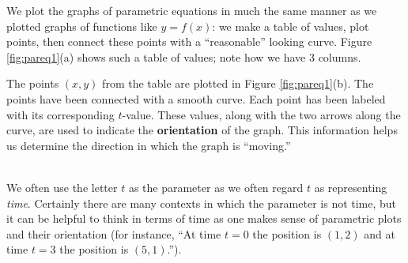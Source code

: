 {We plot the graphs of parametric equations in much the same manner as we plotted graphs of functions like $y=f(x)$: we make a table of values, plot points, then connect these points with a ``reasonable'' looking curve. Figure \ref{fig:pareq1}(a) shows such a table of values; note how we have 3 columns.

The points $(x,y)$ from the table are plotted in Figure \ref{fig:pareq1}(b). The points have been connected with a smooth curve. Each point has been labeled with its corresponding $t$-value. These values, along with the two arrows along the curve, are used to indicate the \textbf{orientation} of the graph. This information helps us determine the direction in which the graph is ``moving.''
}\\

We often use the letter $t$ as the parameter as we often regard $t$ as representing \textit{time}. Certainly there are many contexts in which the parameter is not time, but it can be helpful to think in terms of time as one makes sense of parametric plots and their orientation (for instance, ``At time $t=0$ the position is $(1,2)$ and at time $t=3$ the position is $(5,1)$.'').
\\

